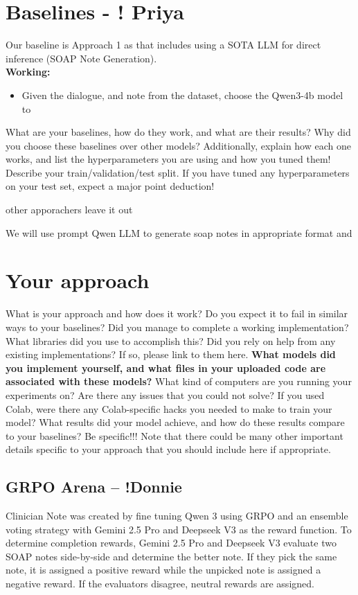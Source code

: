 \documentclass[11pt,a4paper]{article}
\begin{document}
\section{Baselines - ! Priya}
Our baseline is Approach 1 as that includes using a SOTA LLM for direct inference (SOAP Note Generation). 
\\
\textbf{Working:}
\begin{itemize}
    \item Given the dialogue, and note from the dataset, choose the Qwen3-4b model to 
\end{itemize}
What are your baselines, how do they work, and what are their results? Why did you choose these baselines over other models? Additionally, explain how each one works, and list the hyperparameters you are using and how you tuned them! Describe your train/validation/test split. If you have tuned any hyperparameters on your test set, expect a major point deduction! 

other apporachers leave it out

We will use prompt Qwen LLM to generate soap notes in appropriate format and

\section{Your approach}
What is your approach and how does it work? Do you expect it to fail in similar ways to your baselines? Did you manage to complete a working implementation? What libraries did you use to accomplish this? Did you rely on help from any existing implementations? If so, please link to them here. \textbf{What models did you implement yourself, and what files in your uploaded code are associated with these models?} What kind of computers are you running your experiments on? Are there any issues that you could not solve? If you used Colab, were there any Colab-specific hacks you needed to make to train your model? What results did your model achieve, and how do these results compare to your baselines? Be specific!!! Note that there could be many other important details specific to your approach that you should include here if appropriate.

\subsection{GRPO Arena -- !Donnie }
Clinician Note was created by fine tuning Qwen 3 using GRPO and an ensemble voting strategy with Gemini 2.5 Pro and Deepseek V3 as the reward function. To determine completion rewards, Gemini 2.5 Pro and Deepseek V3 evaluate two SOAP notes side-by-side and determine the better note. If they pick the same note, it is assigned a positive reward while the unpicked note is assigned a negative reward. If the evaluators disagree, neutral rewards are assigned.
\end{document}
